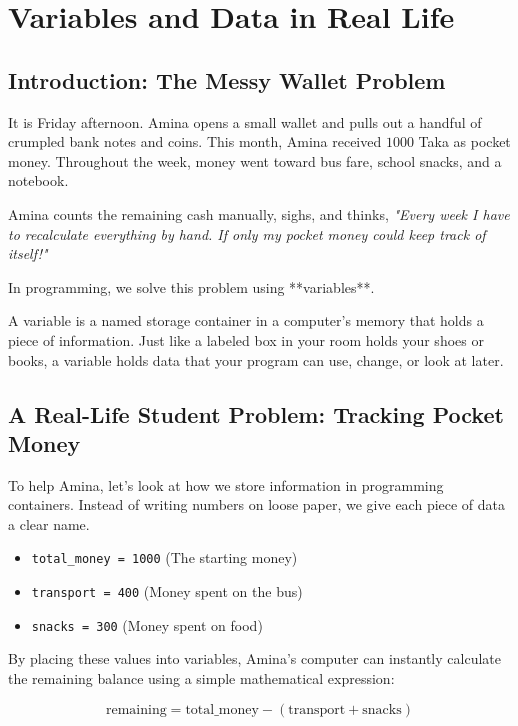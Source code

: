 \chapter{Variables and Data in Real Life}

\section{Introduction: The Messy Wallet Problem}

It is Friday afternoon. Amina opens a small wallet and pulls out a handful of crumpled bank notes and coins. This month, Amina received $1000$ Taka as pocket money. Throughout the week, money went toward bus fare, school snacks, and a notebook.

Amina counts the remaining cash manually, sighs, and thinks, \textit{"Every week I have to recalculate everything by hand. If only my pocket money could keep track of itself!"}

In programming, we solve this problem using **variables**.

\begin{definition}[Variable]
A variable is a named storage container in a computer's memory that holds a piece of information. Just like a labeled box in your room holds your shoes or books, a variable holds data that your program can use, change, or look at later.
\end{definition}

\section{A Real-Life Student Problem: Tracking Pocket Money}

To help Amina, let's look at how we store information in programming containers. Instead of writing numbers on loose paper, we give each piece of data a clear name.

\begin{itemize}
    \item \texttt{total\_money = 1000} (The starting money)
    \item \texttt{transport = 400} (Money spent on the bus)
    \item \texttt{snacks = 300} (Money spent on food)
\end{itemize}

By placing these values into variables, Amina's computer can instantly calculate the remaining balance using a simple mathematical expression:

\[
\text{remaining} = \text{total\_money} - (\text{transport} + \text{snacks})
\]

